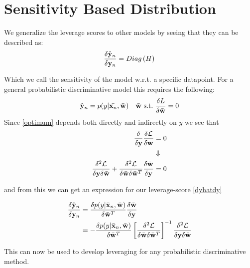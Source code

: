 \documentclass{article}
\begin{document}
\section{Sensitivity Based Distribution}

We generalize the leverage scores to other models by seeing that they can be described as: 
	    \begin{equation}
	    \label{dyhatdy}
	    \frac{\delta \hat{{\bf y}}_n}{\delta {\bf y}_n} = Diag\left(H\right)
	    \end{equation}

Which we call the sensitivity of the model w.r.t. a specific datapoint. For a general probabilistic discriminative model this requires the following:
    	\begin{equation}
    	 \hat{{\bf y}}_n = p(y|\bar{{\bf x}_n},\bar{{\bf w}}) \quad \bar{{\bf w}} \  \text{s.t.} \ \frac{\delta L}{\delta\bar{{\bf w}}}=0     	\label{optimum}
    	\end{equation}
Since \eqref{optimum} depends both directly and indirectly on $y$ we see that
    \begin{align*}
    	\frac{\delta}{\delta {\bf y}} \frac{\delta \mathcal{L}}{\delta {\bf w}} &= 0 \\
    	&\Downarrow\\
    	\frac{\delta^2 \mathcal{L}}{\delta {\bf y} \delta \bar{{\bf w}}} + \frac{\delta^2 \mathcal{L}}{\delta \bar{{\bf w}} \delta \bar{{\bf w}}^T} \frac{\delta \bar{{\bf w}}}{\delta {\bf y}}&= 0
    \end{align*}
    	
    and from this we can get an expression for our leverage-score \eqref{dyhatdy}
    	
    \begin{align}
    		\frac{\delta \hat{{\bf y}}_n}{\delta {\bf y}_n}&=\frac{\delta p(y|\bar{{\bf x}}_n,\bar{{\bf w}})}{\delta \bar{{\bf w}}^T} \frac{\delta \bar{{\bf w}}}{\delta {\bf y}} \nonumber \\
    		&= - \frac{\delta p(y|\bar{{\bf x}}_n,\bar{{\bf w}})}{\delta \bar{{\bf w}}^T} \left[ \frac{\delta^2 \mathcal{L}}{\delta \bar{{\bf w}} \delta \bar{{\bf w}}^T} \right]^{-1} \frac{\delta^2 \mathcal{L}}{\delta {\bf y} \delta \bar{{\bf w}}} \label{eq:sen}
    \end{align}
    	
    This can now be used to develop leveraging for any probabilistic discriminative method. 
    	
\end{document}
